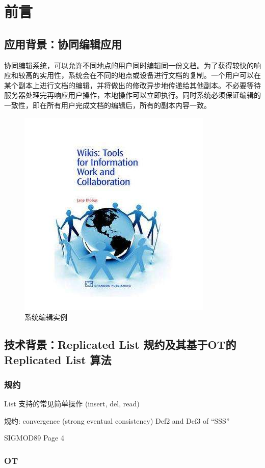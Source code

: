 \chapter{前言}
\section{应用背景：协同编辑应用}
	\par 协同编辑系统，可以允许不同地点的用户同时编辑同一份文档。为了获得较快的响应和较高的实用性，系统会在不同的地点或设备进行文档的复制。一个用户可以在某个副本上进行文档的编辑，并将做出的修改异步地传递给其他副本。不必要等待服务器处理完再响应用户操作，本地操作可以立即执行。同时系统必须保证编辑的一致性，即在所有用户完成文档的编辑后，所有的副本内容一致。
\begin{figure}
\centering
\includegraphics{figures/timg.jpg}
\caption{系统编辑实例}
\label{fig:graph}
\end{figure}
\section{技术背景：Replicated List 规约及其基于OT的 Replicated List 算法}

\subsection{规约}
List 支持的常见简单操作 (insert, del, read)

规约: convergence (strong eventual consistency)
Def2 and Def3 of ``SSS''

SIGMOD89 Page 4

\subsection{OT}

